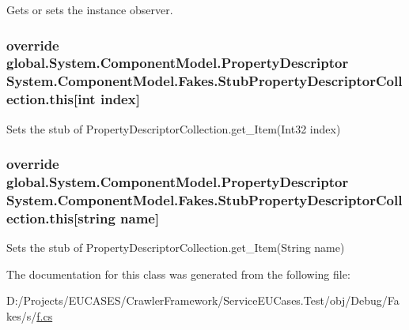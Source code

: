 Gets or sets the instance observer.

\hypertarget{class_system_1_1_component_model_1_1_fakes_1_1_stub_property_descriptor_collection_af6b1cc282977fe515490bd698ef99a65}{
\subsubsection[{this[int index]}]{\setlength{\rightskip}{0pt plus 5cm}override global.\-System.\-Component\-Model.\-Property\-Descriptor System.\-Component\-Model.\-Fakes.\-Stub\-Property\-Descriptor\-Collection.\-this\mbox{[}int {\bf index}\mbox{]}\hspace{0.3cm}{\ttfamily [get]}}}\label{class_system_1_1_component_model_1_1_fakes_1_1_stub_property_descriptor_collection_af6b1cc282977fe515490bd698ef99a65}


Sets the stub of Property\-Descriptor\-Collection.\-get\-\_\-\-Item(\-Int32 index)

\hypertarget{class_system_1_1_component_model_1_1_fakes_1_1_stub_property_descriptor_collection_a4b79a2f4c57d81105c12e826bb6fd397}{
\subsubsection[{this[string name]}]{\setlength{\rightskip}{0pt plus 5cm}override global.\-System.\-Component\-Model.\-Property\-Descriptor System.\-Component\-Model.\-Fakes.\-Stub\-Property\-Descriptor\-Collection.\-this\mbox{[}string name\mbox{]}\hspace{0.3cm}{\ttfamily [get]}}}\label{class_system_1_1_component_model_1_1_fakes_1_1_stub_property_descriptor_collection_a4b79a2f4c57d81105c12e826bb6fd397}


Sets the stub of Property\-Descriptor\-Collection.\-get\-\_\-\-Item(\-String name)



The documentation for this class was generated from the following file\-:\begin{DoxyCompactItemize}
\item 
D\-:/\-Projects/\-E\-U\-C\-A\-S\-E\-S/\-Crawler\-Framework/\-Service\-E\-U\-Cases.\-Test/obj/\-Debug/\-Fakes/s/\hyperlink{s_2f_8cs}{f.\-cs}\end{DoxyCompactItemize}
